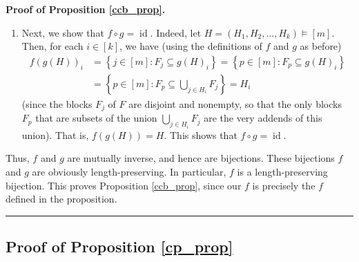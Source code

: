 \documentclass[12pt]{article}
\theoremstyle{definition}%
\theoremstyle{definition}%
\theoremstyle{remark}%
\newcommand{\tup}[1]{\left( #1 \right)}
\newcommand{\interval}[1]{\left[ #1 \right]} %
\newcommand{\set}[1]{\left\{ #1 \right\}}
\newcommand{\id}{\operatorname{id}}
\newenvironment{proof}[1][Proof]{\noindent\textbf{#1.} }{\ \rule{0.5em}{0.5em}}
\begin{document}
\begin{proof}[Proof of Proposition \ref{ccb_prop}]
\begin{enumerate}
	So we have shown that $g\tup{f\tup{G}}_i = G_i$ for each $i \in \interval{k}$.
	In other words, $g\tup{f\tup{G}} = G$. Hence, $g \circ f = \id$ is proved.
	\item Next, we show that $f \circ g = \id$.
	Indeed, let $H = \tup{H_1, H_2, \ldots, H_k} \models \interval{m}$. Then, for each $i \in \interval{k}$, we have
	(using the definitions of $f$ and $g$ as before)
    \begin{align*}
    f\tup{g\tup{H}}_{i} &= \set{j \in \interval{m} : F_{j} \subseteq g\tup{H}_{i}}
	= \set{p \in \interval{m} : F_p \subseteq g\tup{H}_{i}}
	\\
	&= \set{p \in \interval{m} : F_p \subseteq \bigcup_{j \in H_{i}} F_{j}}
    = H_i
    \end{align*}
	(since the blocks $F_j$ of $F$ are disjoint and nonempty, so that the only blocks $F_p$ that are subsets of the union $\bigcup_{j \in H_{i}} F_{j}$ are the very addends of this union).
    That is, $f\tup{g\tup{H}} = H$.
	This shows that $f \circ g = \id$.
	\end{enumerate}
	
	Thus, $f$ and $g$ are mutually inverse, and hence are bijections.
	These bijections $f$ and $g$ are obviously length-preserving.
	In particular, $f$ is a length-preserving bijection.
	This proves Proposition \ref{ccb_prop}, since our $f$ is precisely the $f$ defined in the proposition.
\end{proof}

\subsection{\label{subsec.omitted_proofs.cp_prop}Proof of Proposition \ref{cp_prop}}
\end{document}
